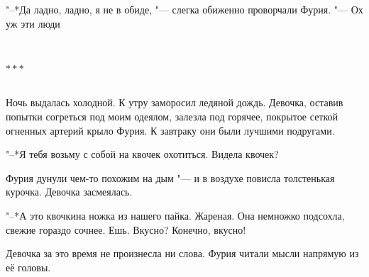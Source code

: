 \documentclass[a4paper,10pt,fleqn]{book}
\newcommand{\ldotst}{\so{...}\xspace}
\newcommand{\razd}{~\\{\centering\Large\bfseries$\ast \ast \ast$\par}~\\}
\begin{document}
"--*Да ладно, ладно, я не в обиде, "--- слегка обиженно проворчали Фурия.
"--- Ох уж эти люди\ldotst

\razd

Ночь выдалась холодной.
К утру заморосил ледяной дождь.
Девочка, оставив попытки согреться под моим одеялом, залезла под горячее, покрытое сеткой огненных артерий крыло Фурия.
К завтраку они были лучшими подругами.

"--*Я тебя возьму с собой на квочек охотиться.
Видела квочек?

Фурия дунули чем-то похожим на дым "--- и в воздухе повисла толстенькая курочка.
Девочка засмеялась.

"--*А это квочкина ножка из нашего пайка.
Жареная.
Она немножко подсохла, свежие гораздо сочнее.
Ешь.
Вкусно?
Конечно, вкусно!

Девочка за это время не произнесла ни слова.
Фурия читали мысли напрямую из её головы.
\end{document}
